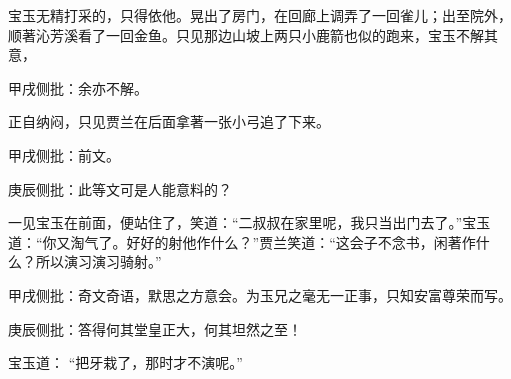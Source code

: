 \begin{parag}
    宝玉无精打采的，只得依他。晃出了房门，在回廊上调弄了一回雀儿；出至院外，顺著沁芳溪看了一回金鱼。只见那边山坡上两只小鹿箭也似的跑来，宝玉不解其意，\begin{note}甲戌侧批：余亦不解。\end{note}正自纳闷，只见贾兰在后面拿著一张小弓追了下来。\begin{note}甲戌侧批：前文。\end{note}\begin{note}庚辰侧批：此等文可是人能意料的？\end{note}一见宝玉在前面，便站住了，笑道：“二叔叔在家里呢，我只当出门去了。”宝玉道：“你又淘气了。好好的射他作什么？”贾兰笑道：“这会子不念书，闲著作什么？所以演习演习骑射。”\begin{note}甲戌侧批：奇文奇语，默思之方意会。为玉兄之毫无一正事，只知安富尊荣而写。\end{note}\begin{note}庚辰侧批：答得何其堂皇正大，何其坦然之至！\end{note}宝玉道： “把牙栽了，那时才不演呢。”
\end{parag}


